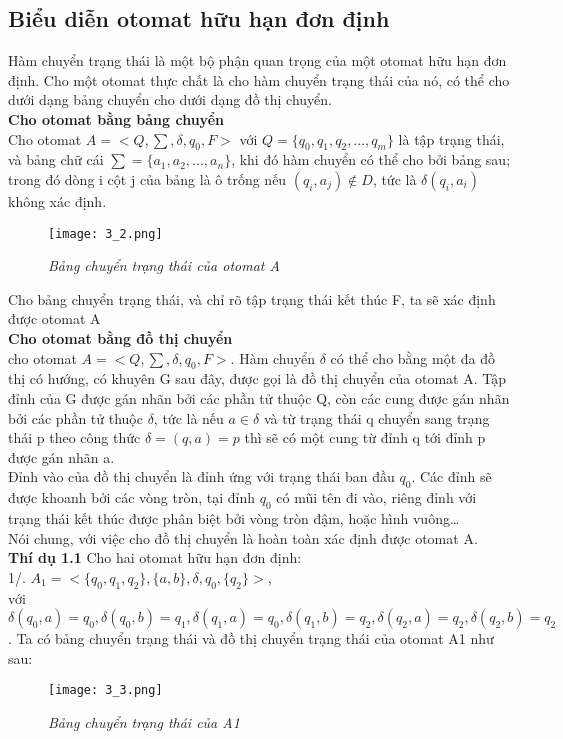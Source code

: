 \begin{flushleft}
\subsection{Biểu diễn otomat hữu hạn đơn định}
\hspace{10mm}Hàm chuyển trạng thái là một bộ phận quan trọng của một otomat hữu hạn đơn định. Cho một otomat thực chất là cho hàm chuyển trạng thái của nó, có thể cho dưới dạng bảng chuyển cho dưới dạng đồ thị chuyển.\\
\textbf{Cho otomat bằng bảng chuyển}\\
Cho otomat $A = <Q, \sum, \delta, q_0, F>$ với $Q = \{ q_0, q_1, q_2,...,q_m \}$ là tập trạng thái, và bảng chữ
cái $\sum = \{ a_1, a_2,...,a_n \}$, khi đó hàm chuyển có thể cho bởi bảng sau; trong đó dòng i cột j của
bảng là ô trống nếu $(q_i, a_j) \not \in D$, tức là $\delta(q_i, a_i)$ không xác định. 
\begin{figure}[ht]
\texttt{[image: 3\_2.png]}
\caption{ \textit{Bảng chuyển trạng thái của otomat A} }
\end{figure}
\end{flushleft}
\begin{flushleft}
Cho bảng chuyển trạng thái, và chỉ rõ tập trạng thái kết thúc F, ta sẽ xác định được otomat A\\
\textbf{Cho otomat bằng đồ thị chuyển}\\
cho otomat  $A = <Q, \sum, \delta, q_0, F>$. Hàm chuyển $\delta$ có thể cho bằng một đa đồ thị có hướng, có khuyên G sau đây, được gọi là đồ thị chuyển của otomat A. Tập đỉnh của G được gán nhãn bởi các phần tử thuộc Q, còn các cung được gán nhãn bởi các phần tử thuộc $\delta$, tức là nếu $a \in \delta$ và từ trạng thái q chuyển sang trạng thái p theo công thức $\delta = (q,a) = p$ thì sẽ có một cung từ đỉnh q tới đỉnh p được gán nhãn a.\\
Đỉnh vào của đồ thị chuyển là đỉnh ứng với trạng thái ban đầu $q_0$. Các đỉnh sẽ được khoanh bởi các vòng tròn, tại đỉnh $q_0$ có mũi tên đi vào, riêng đỉnh với trạng thái kết thúc được phân biệt bởi vòng tròn đậm, hoặc hình vuông…\\
Nói chung, với việc cho đồ thị chuyển là hoàn toàn xác định được otomat A.\\
\textbf{Thí dụ 1.1 } Cho hai otomat hữu hạn đơn định:\\
1/. $A_1 = <\{ q_0, q_1, q_2 \}, \{ a,b \}, \delta, q_0, \{ q_2 \}>$,\\
với $\delta(q_0, a) = q_0, \delta(q_0, b) = q_1, \delta(q_1, a) = q_0, \delta(q_1, b) = q_2, \delta(q_2, a) = q_2, \delta(q_2, b)=q_2$.
Ta có bảng chuyển trạng thái và đồ thị chuyển trạng thái của otomat A1 như sau:\\
\begin{figure}[ht]
        \texttt{[image: 3\_3.png]}
        \caption{ \textit{ Bảng chuyển trạng thái của A1} }
        \end{figure}
\end{flushleft}


